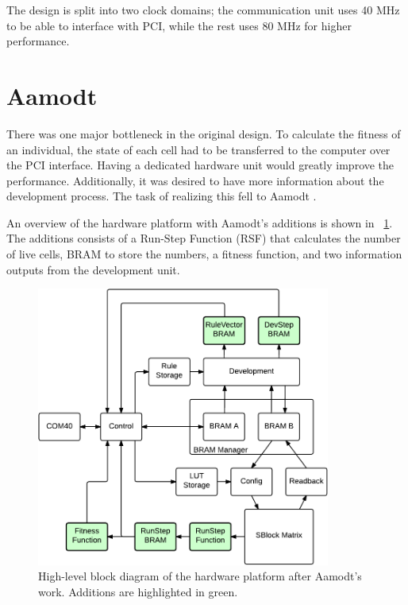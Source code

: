 The design is split into two clock domains; the communication unit uses 40 MHz to be able to interface with PCI, while the rest uses 80 MHz for higher performance.


\section{Aamodt}

There was one major bottleneck in the original design.
To calculate the fitness of an individual, the state of each cell had to be transferred to the computer over the PCI interface.
Having a dedicated hardware unit would greatly improve the performance.
Additionally, it was desired to have more information about the development process.
The task of realizing this fell to Aamodt \cite{aamodt2005sblock}.

An overview of the hardware platform with Aamodt's additions is shown in \figurename~\ref{fig:overview-aamodt}.
The additions consists of a Run-Step Function (RSF) that calculates the number of live cells, BRAM to store the numbers, a fitness function, and two information outputs from the development unit.

\begin{figure}[!ht]
    \centering
    \includegraphics[width=0.86\textwidth]{figures/overview-aamodt}
    \caption[Aamodt's hardware design.]{
        High-level block diagram of the hardware platform after Aamodt's work.
        Additions are highlighted in green.
    }
    \label{fig:overview-aamodt}
\end{figure}

